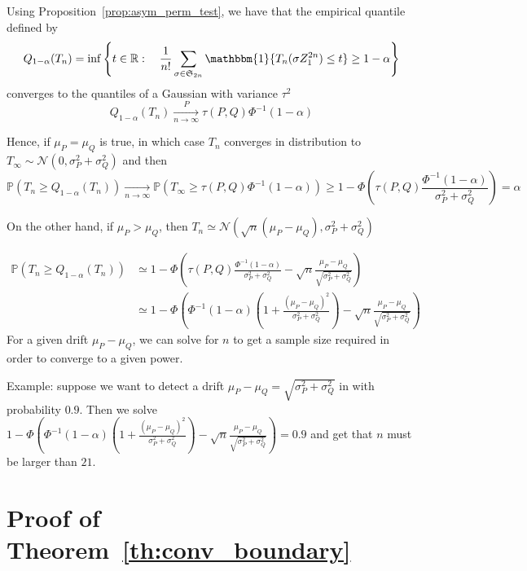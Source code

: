 \documentclass{article}
\theoremstyle{plain}
\theoremstyle{remark}
\renewcommand{\P}{\mathbb{P}}
\newcommand{\R}{\mathbb{R}}
\renewcommand{\S}{\mathfrak{S}}
\newcommand{\1}{\mathbbm{1}}
\numberwithin{equation}{section}
\begin{document}
Using Proposition~\ref{prop:asym_perm_test}, we have that the empirical quantile defined by
$$Q_{1-\alpha}(T_n) = \inf\left\{t \in \R:\quad \frac{1}{n!}\sum_{\sigma \in \S_{2n}} \1\{T_n(\sigma Z_{1}^{2n}) \le t\} \ge 1-\alpha\right\} $$
converges to the quantiles of a Gaussian with variance $\tau^2$
$$Q_{1-\alpha}(T_n)\xrightarrow[n \to \infty]{P} \tau(P,Q)\Phi^{-1}(1-\alpha) $$

 Hence, if $\mu_P = \mu_Q$ is true, in which case $T_n$ converges in distribution to $T_\infty\sim \mathcal{N}(0,\sigma_P^2+\sigma_Q^2 )$ and then
$$\P\left( T_n \ge Q_{1-\alpha}(T_n)\right) \xrightarrow[n \to \infty]{} \P(T_\infty\ge \tau(P,Q)\Phi^{-1}(1-\alpha)) \ge  1-\Phi\left(\tau(P,Q)\frac{\Phi^{-1}(1-\alpha)}{\sigma_P^2+\sigma_Q^2 } \right)=\alpha  $$

On the other hand, if $\mu_P > \mu_Q$, then $T_n \simeq \mathcal{N}(\sqrt{n}(\mu_P-\mu_Q),\sigma_P^2+\sigma_Q^2 ) $

\begin{align*}
\P\left( T_n \ge Q_{1-\alpha}(T_n)\right)&\simeq  1-\Phi\left(\tau(P,Q)\frac{\Phi^{-1}(1-\alpha)}{\sigma_P^2+\sigma_Q^2 }-  \sqrt{n}\frac{\mu_P-\mu_Q}{\sqrt{\sigma_P^2+\sigma_Q^2}} \right)  \\
&\simeq  1-\Phi\left(\Phi^{-1}(1-\alpha)\left(1+\frac{(\mu_P-\mu_Q)^2}{\sigma_P^2+\sigma_Q^2 }\right)-  \sqrt{n}\frac{\mu_P-\mu_Q}{\sqrt{\sigma_P^2+\sigma_Q^2}} \right)
\end{align*}
For a given drift $\mu_P-\mu_Q$, we can solve for $n$ to get a sample size required in order to converge to a given power.

Example: suppose we want to detect a drift $\mu_P-\mu_Q=\sqrt{\sigma_P^2+\sigma_Q^2}$ in with probability $0.9$. Then we solve $1-\Phi\left(\Phi^{-1}(1-\alpha)\left(1+\frac{(\mu_P-\mu_Q)^2}{\sigma_P^2+\sigma_Q^2 }\right)-  \sqrt{n}\frac{\mu_P-\mu_Q}{\sqrt{\sigma_P^2+\sigma_Q^2}} \right) = 0.9$ and get that $n$ must be larger than $21$.
\section{Proof of Theorem~\ref{th:conv_boundary}}
\end{document}
